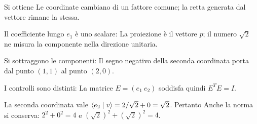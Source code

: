 \ExSolution


Si ottiene
Le coordinate cambiano di un fattore comune; la retta generata dal vettore rimane la stessa.


Il coefficiente lungo \(e_1\) è uno scalare:
La proiezione è il vettore \(p\); il numero \(\sqrt2\) ne misura la componente nella direzione unitaria.


Si sottraggono le componenti:
Il segno negativo della seconda coordinata porta dal punto \((1,1)\) al punto \((2,0)\).


I controlli sono distinti:
La matrice \(E=(e_1\ e_2)\) soddisfa quindi \(E^TE=I\).


La seconda coordinata vale \(\langle e_2\mid v\rangle=2/\sqrt2+0=\sqrt2\). Pertanto
Anche la norma si conserva: \(2^2+0^2=4\) e \((\sqrt2)^2+(\sqrt2)^2=4\).

